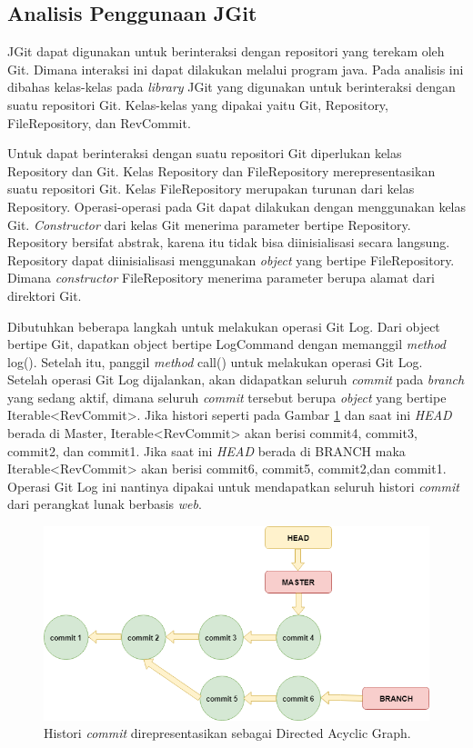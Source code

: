 \subsection{Analisis Penggunaan JGit}
\label{subsec:analisis_jgit}
JGit dapat digunakan untuk berinteraksi dengan repositori yang terekam oleh Git. Dimana interaksi ini dapat dilakukan melalui program java. Pada analisis ini dibahas kelas-kelas pada \textit{library} JGit yang digunakan untuk berinteraksi dengan suatu repositori Git. Kelas-kelas yang dipakai yaitu Git, Repository, FileRepository, dan RevCommit.

Untuk dapat berinteraksi dengan suatu repositori Git diperlukan kelas Repository dan Git. Kelas Repository dan FileRepository merepresentasikan suatu repositori Git. Kelas FileRepository merupakan turunan dari kelas Repository. Operasi-operasi pada Git dapat dilakukan dengan menggunakan kelas Git. \textit{Constructor} dari kelas Git menerima parameter bertipe Repository. Repository bersifat abstrak, karena itu tidak bisa diinisialisasi secara langsung. Repository dapat diinisialisasi menggunakan \textit{object} yang bertipe FileRepository. Dimana \textit{constructor} FileRepository menerima parameter berupa alamat dari direktori Git. 

Dibutuhkan beberapa langkah untuk melakukan operasi Git Log. Dari object bertipe Git, dapatkan object bertipe LogCommand dengan memanggil \textit{method} log(). Setelah itu, panggil \textit{method} call() untuk melakukan operasi Git Log. Setelah operasi Git Log dijalankan, akan didapatkan seluruh \textit{commit} pada \textit{branch} yang sedang aktif, dimana seluruh \textit{commit} tersebut berupa \textit{object} yang bertipe Iterable<RevCommit>. Jika histori seperti pada Gambar \ref{fig:DAG} dan saat ini \textit{HEAD} berada di Master, Iterable<RevCommit> akan berisi commit4, commit3, commit2, dan commit1. Jika saat ini \textit{HEAD} berada di BRANCH maka Iterable<RevCommit> akan berisi commit6, commit5, commit2,dan commit1. Operasi Git Log ini nantinya dipakai untuk mendapatkan seluruh histori \textit{commit} dari perangkat lunak berbasis \textit{web}.

\begin{figure}[H]
	\centering
		\includegraphics[scale=0.6]{Gambar/DAG.png}
	\caption{Histori \textit{commit} direpresentasikan sebagai Directed Acyclic Graph.}
	\label{fig:DAG}
\end{figure}

